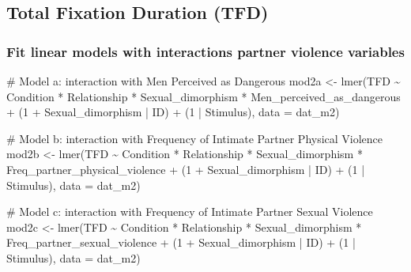 \documentclass[
  bookmarksnumbered]{article}
\newenvironment{Shaded}{\begin{snugshade}}{\end{snugshade}}
\newcommand{\AttributeTok}[1]{\textcolor[rgb]{0.80,0.80,0.80}{#1}}
\newcommand{\CommentTok}[1]{\textcolor[rgb]{0.50,0.62,0.50}{#1}}
\newcommand{\DecValTok}[1]{\textcolor[rgb]{0.86,0.86,0.80}{#1}}
\newcommand{\FunctionTok}[1]{\textcolor[rgb]{0.94,0.94,0.56}{#1}}
\newcommand{\NormalTok}[1]{\textcolor[rgb]{0.80,0.80,0.80}{#1}}
\newcommand{\OtherTok}[1]{\textcolor[rgb]{0.94,0.94,0.56}{#1}}
\newcommand{\SpecialCharTok}[1]{\textcolor[rgb]{0.86,0.64,0.64}{#1}}
\begin{document}
\subsection{Total Fixation Duration (TFD)}\label{total-fixation-duration-tfd-1}

\subsubsection{Fit linear models with interactions partner violence variables}\label{fit-linear-models-with-interactions-partner-violence-variables-1}

\begin{Shaded}
\begin{Highlighting}[]
\CommentTok{\# Model a: interaction with Men Perceived as Dangerous}
\NormalTok{mod2a }\OtherTok{\textless{}{-}} \FunctionTok{lmer}\NormalTok{(TFD }\SpecialCharTok{\textasciitilde{}}
\NormalTok{                Condition }\SpecialCharTok{*}\NormalTok{ Relationship }\SpecialCharTok{*}\NormalTok{ Sexual\_dimorphism }\SpecialCharTok{*}\NormalTok{ Men\_perceived\_as\_dangerous }\SpecialCharTok{+}
\NormalTok{                (}\DecValTok{1} \SpecialCharTok{+}\NormalTok{ Sexual\_dimorphism }\SpecialCharTok{|}\NormalTok{ ID) }\SpecialCharTok{+}\NormalTok{ (}\DecValTok{1} \SpecialCharTok{|}\NormalTok{ Stimulus), }
              \AttributeTok{data =}\NormalTok{ dat\_m2)}

\CommentTok{\# Model b: interaction with Frequency of Intimate Partner Physical Violence}
\NormalTok{mod2b }\OtherTok{\textless{}{-}} \FunctionTok{lmer}\NormalTok{(TFD }\SpecialCharTok{\textasciitilde{}}
\NormalTok{                Condition }\SpecialCharTok{*}\NormalTok{ Relationship }\SpecialCharTok{*}\NormalTok{ Sexual\_dimorphism }\SpecialCharTok{*}\NormalTok{ Freq\_partner\_physical\_violence }\SpecialCharTok{+}
\NormalTok{                (}\DecValTok{1} \SpecialCharTok{+}\NormalTok{ Sexual\_dimorphism }\SpecialCharTok{|}\NormalTok{ ID) }\SpecialCharTok{+}\NormalTok{ (}\DecValTok{1} \SpecialCharTok{|}\NormalTok{ Stimulus), }
              \AttributeTok{data =}\NormalTok{ dat\_m2)}

\CommentTok{\# Model c: interaction with Frequency of Intimate Partner Sexual Violence}
\NormalTok{mod2c }\OtherTok{\textless{}{-}} \FunctionTok{lmer}\NormalTok{(TFD }\SpecialCharTok{\textasciitilde{}}
\NormalTok{                Condition }\SpecialCharTok{*}\NormalTok{ Relationship }\SpecialCharTok{*}\NormalTok{ Sexual\_dimorphism }\SpecialCharTok{*}\NormalTok{ Freq\_partner\_sexual\_violence }\SpecialCharTok{+}
\NormalTok{                (}\DecValTok{1} \SpecialCharTok{+}\NormalTok{ Sexual\_dimorphism }\SpecialCharTok{|}\NormalTok{ ID) }\SpecialCharTok{+}\NormalTok{ (}\DecValTok{1} \SpecialCharTok{|}\NormalTok{ Stimulus), }
              \AttributeTok{data =}\NormalTok{ dat\_m2)}


\end{Highlighting}
\end{Shaded}
\end{document}
